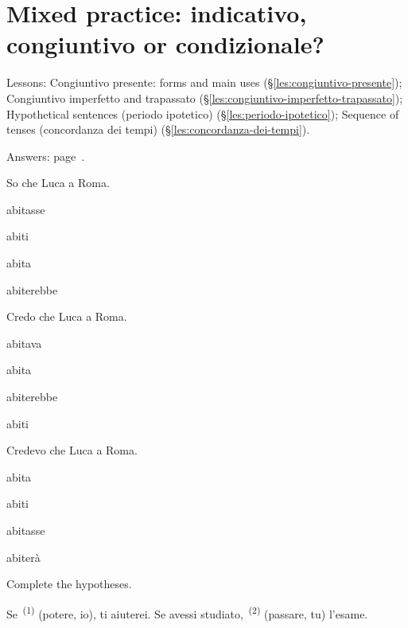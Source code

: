 \documentclass[11pt,a4paper,twoside,openright]{book}
\newcommand{\blank}{\underline{\hspace{2.6cm}}}
\newcommand{\clozeblank}[1]{\underline{\hspace{2.4cm}}\textsuperscript{\,(#1)}}
\begin{document}
\section{Mixed practice: indicativo, congiuntivo or condizionale?}\label{set:mixed-moods}
{\small Lessons: Congiuntivo presente: forms and main uses (\S\ref{les:congiuntivo-presente}); Congiuntivo imperfetto and trapassato (\S\ref{les:congiuntivo-imperfetto-trapassato}); Hypothetical sentences (periodo ipotetico) (\S\ref{les:periodo-ipotetico}); Sequence of tenses (concordanza dei tempi) (\S\ref{les:concordanza-dei-tempi}).}\par
{\color{muted}\small Answers: page~\pageref{ans:set:mixed-moods}.}

\begin{exercises}
\item\label{ex:mix-mood-1}\relax So che Luca \blank{} a Roma.\par\nopagebreak\begin{options}
\item\relax abitasse
\item\relax abiti
\item\relax abita
\item\relax abiterebbe
\end{options}
\item\label{ex:mix-mood-2}\relax Credo che Luca \blank{} a Roma.\par\nopagebreak\begin{options}
\item\relax abitava
\item\relax abita
\item\relax abiterebbe
\item\relax abiti
\end{options}
\item\label{ex:mix-mood-3}\relax Credevo che Luca \blank{} a Roma.\par\nopagebreak\begin{options}
\item\relax abita
\item\relax abiti
\item\relax abitasse
\item\relax abiterà
\end{options}
\item\label{ex:mix-mood-4}\relax Complete the hypotheses.\par\smallskip\begingroup\setlength{\parindent}{0pt}Se \clozeblank{1} (potere, io), ti aiuterei. Se avessi studiato, \clozeblank{2} (passare, tu) l’esame.\par\endgroup

\end{exercises}
\end{document}
